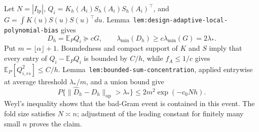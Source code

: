 Let \(N=|I_{\mathrm{lp}}|\), \(Q_i=K_h(A_i)S_h(A_i)S_h(A_i)^\top\), and \(G=\int K(u)S(u)S(u)^\top du\). Lemma~\texttt{lem:design-adaptive-local-polynomial-bias} gives
\[
D_h=\mathbb E_PQ_i\succeq cG,
\qquad
\lambda_{\min}(D_h)\ge c\lambda_{\min}(G)=2\lambda_*.
\]
Put \(m=\lfloor\alpha\rfloor+1\). Boundedness and compact support of \(K\) and \(S\) imply that every entry of \(Q_i-\mathbb E_PQ_i\) is bounded by \(C/h\), while \(f_A\le1/c\) gives \(\mathbb E_P[Q_{i,rs}^2]\le C/h\). Lemma~\texttt{lem:bounded-sum-concentration}, applied entrywise at average threshold \(\lambda_*/m\), and a union bound give
\[
P\{\|\widehat D_h-D_h\|_{\mathrm{op}}>\lambda_*\}
\le2m^2\exp(-c_0Nh).
\]
Weyl's inequality shows that the bad-Gram event is contained in this event. The fold size satisfies \(N\asymp n\); adjustment of the leading constant for finitely many small \(n\) proves the claim.